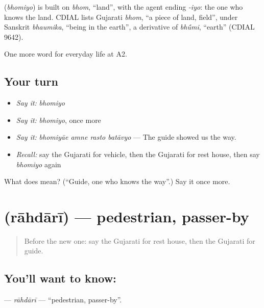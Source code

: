 \begin{cousinweb}
\textbf{} (\emph{bhomiyo}) is built on \emph{bhom}, \textquotedblleft{}land\textquotedblright{}, with the agent ending \emph{-iyo}: the one who knows the land. CDIAL lists Gujarati \emph{bhom}, \textquotedblleft{}a piece of land, field\textquotedblright{}, under Sanskrit \emph{bhaumika}, \textquotedblleft{}being in the earth\textquotedblright{}, a derivative of \emph{bhū́mi}, \textquotedblleft{}earth\textquotedblright{} (CDIAL 9642).
\end{cousinweb}

\begin{grammarlens}[title={What you've built}]
One more word for everyday life at A2.
\end{grammarlens}

\subsection*{Your turn}
\begin{itemize}
\raggedright
  \item \emph{Say it:} \emph{bhomiyo}
  \item \emph{Say it:} \emph{bhomiyo}, once more
  \item \emph{Say it:} \emph{bhomiyāe amne rasto batāvyo} — The guide showed us the way.
  \item \emph{Recall:} say the Gujarati for vehicle, then the Gujarati for rest house, then say \emph{bhomiyo} again
\end{itemize}

\begin{tcolorbox}[breakable,colback=teal!4,colframe=teal!35!black,title={Before you move on}]
What does  mean? (\textquotedblleft{}Guide, one who knows the way\textquotedblright{}.) Say it once more.
\end{tcolorbox}
\section[\texorpdfstring{\gu{રાહદારી} (rāhdārī)}{રાહદારી (rāhdārī)}]{ (rāhdārī) — pedestrian, passer-by}

\label{lesson:GU-C212-rahdari}



\begin{quote}
Before the new one: say the Gujarati for rest house, then the Gujarati for guide.
\end{quote}

\subsection*{You'll want to know: }
\textbf{} — \emph{rāhdārī} — \textquotedblleft{}pedestrian, passer-by\textquotedblright{}.

